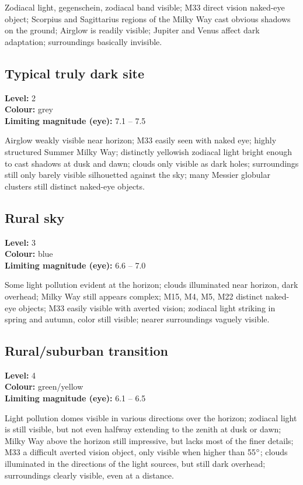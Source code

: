 Zodiacal light, gegenschein, zodiacal band visible; M33 direct vision naked-eye object; Scorpius and Sagittarius regions of the Milky Way cast obvious shadows on the ground; Airglow is readily visible; Jupiter and Venus affect dark adaptation; surroundings basically invisible.

\subsection{Typical truly dark site}
\textbf{Level:} 2 \\
\textbf{Colour:} grey \\
\textbf{Limiting magnitude (eye):} 7.1 -- 7.5

Airglow weakly visible near horizon; M33 easily seen with naked eye; highly structured Summer Milky Way; distinctly yellowish zodiacal light bright enough to cast shadows at dusk and dawn; clouds only visible as dark holes; surroundings still only barely visible silhouetted against the sky; many Messier globular clusters still distinct naked-eye objects.

\subsection{Rural sky}
\textbf{Level:} 3 \\
\textbf{Colour:} blue \\
\textbf{Limiting magnitude (eye):} 6.6 -- 7.0

Some light pollution evident at the horizon; clouds illuminated near horizon, dark overhead; Milky Way still appears complex; M15, M4, M5, M22 distinct naked-eye objects; M33 easily visible with averted vision; zodiacal light striking in spring and
autumn, color still visible; nearer surroundings vaguely visible.

\subsection{Rural/suburban transition}
\textbf{Level:} 4 \\
\textbf{Colour:} green/yellow \\
\textbf{Limiting magnitude (eye):} 6.1 -- 6.5

Light pollution domes visible in various directions over the horizon; zodiacal light is still visible, but not even halfway extending to the zenith at dusk or dawn; Milky Way above the horizon still impressive, but lacks most of the finer details; M33 a difficult averted vision object, only visible when higher than 55$\degree$; clouds illuminated in the directions of the light sources, but still dark overhead; surroundings clearly visible, even at a distance.


